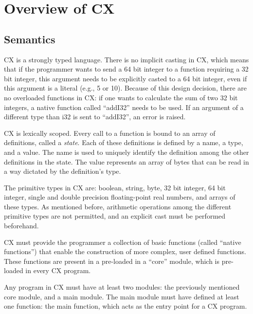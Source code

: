 
\chapter{Overview of CX}
\label{overview}

\section{Semantics}
\label{semanticsection}

CX is a strongly typed language. %
There is no implicit casting in CX, which means that if the programmer
wants to send a 64 bit integer to a function requiring a 32 bit
integer, this argument needs to be explicitly casted to a 64 bit
integer, even if this argument is a literal (e.g., 5 or 10). Because
of this design decision, there are no overloaded functions in CX: if
one wants to calculate the sum of two 32 bit integers, a native
function called ``addI32'' needs to be used. If an argument of
a different type than i32 is sent to ``addI32'', an error is raised.

CX is lexically scoped. Every call to a function is bound to an array
of definitions, called a \textit{state}. Each of these definitions is
defined by a name, a type, and a value. The name is used to uniquely
identify the definition among the other definitions in the state. The
value represents an array of bytes that can be read in a way dictated
by the definition's type.

The primitive types in CX are: boolean, string, byte, 32 bit integer,
64 bit integer, single and double precision floating-point real
numbers, and arrays of these types. As mentioned before, arithmetic
operations among the different primitive types are not permitted, and
an explicit cast must be performed beforehand.

CX must provide the programmer a collection of basic functions (called
``native functions'') that enable the construction of more complex,
user defined functions. These functions are present in a pre-loaded
in a ``core'' module, which is pre-loaded in every CX program.

Any program in CX must have at least two modules: the previously
mentioned core module, and a main module. The main module must have
defined at least one function: the main function, which acts as the
entry point for a CX program.


